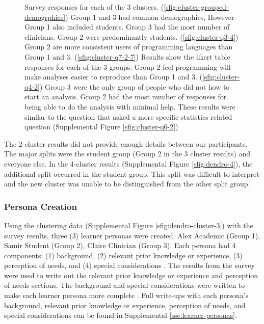 \documentclass[020-persona\_validation.tex]{subfiles}
\begin{document}
\begin{figure}[!htbp]
            {Survey responses for each of the 3 clusters.
                (\ref{sfig:cluster-grouped-demogrphics})
                Group 1 and 3 had common demographics, However Group 1 also included students.
                Group 3 had the most number of clinicians.
                Group 2 were predominantly students.
                (\ref{sfig:cluster-q3-4})
                Group 2 are more consistent users of programming languages than Group 1 and 3.
                (\ref{sfig:cluster-q7-2-7})
                Results show the likert table responses for each of the 3 groups.
                Group 2 feel programming will make analyses easier to reproduce than Group 1 and 3.
                (\ref{sfig:cluster-q4-2})
                Group 3 were the only group of people who did not how to start an analysis.
                Group 2 had the most number of responses for being able to do the analysis with minimal help.
                These results were similar to the question that asked a more specific statistics related question
                (Supplemental Figure \ref{sfig:cluster-q6-2})
            }
            \label{fig:cluster-results}
        \end{figure}

        The 2-cluster results did not provide enough details between our participants.
        The major splits were the student group (Group 2 in the 3 cluster results) and everyone else.
        In the 4-cluster results
        (Supplemental Figure \ref{sfig:dendro-4}),
        the additional split occurred in the student group.
        This split was difficult to interpret and the new cluster was unable to be distinguished from the other split group.

    \subsubsection{Persona Creation}

        Using the clustering data (Supplemental Figure \ref{sfig:dendro-cluster-3})
        with the survey results, three (3) learner personas were created:
        Alex Academic (Group 1), Samir Student (Group 2), Claire Clinician (Group 3).
        Each persona had 4 components: (1) background, (2) relevant prior knowledge or experience,
        (3) perception of needs, and (4) special considerations
        \cite{rstudioLearnerPersonas2019, softwarecarpentryLearnerProfiles, wilson2019teaching}.
        The results from the survey were used to write out the
        relevant prior knowledge or experience and perception of needs sections.
        The background and special considerations were written to make each learner persona more complete
        \cite{pruittPersonaLifecycleKeeping2006}.
        Full write-ups with each persona's
        background, relevant prior knowledge or experience, perception of needs, and special considerations
        can be found in Supplemental \ref{sse:learner-personas}.
\end{document}
